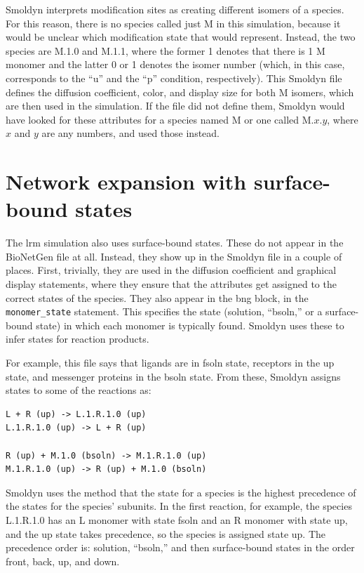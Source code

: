 \documentclass {scrbook}
\newcommand {\ttt} {\texttt}
\begin{document}
Smoldyn interprets modification sites as creating different isomers of a species. For this reason, there is no species called just M in this simulation, because it would be unclear which modification state that would represent. Instead, the two species are M.1.0 and M.1.1, where the former 1 denotes that there is 1 M monomer and the latter 0 or 1 denotes the isomer number (which, in this case, corresponds to the ``u'' and the ``p'' condition, respectively). This Smoldyn file defines the diffusion coefficient, color, and display size for both M isomers, which are then used in the simulation. If the file did not define them, Smoldyn would have looked for these attributes for a species named M or one called M.$x$.$y$, where $x$ and $y$ are any numbers, and used those instead.

\section{Network expansion with surface-bound states}

The lrm simulation also uses surface-bound states. These do not appear in the BioNetGen file at all. Instead, they show up in the Smoldyn file in a couple of places. First, trivially, they are used in the diffusion coefficient and graphical display statements, where they ensure that the attributes get assigned to the correct states of the species. They also appear in the bng block, in the \ttt{monomer\_state} statement. This specifies the state (solution, ``bsoln,'' or a surface-bound state) in which each monomer is typically found. Smoldyn uses these to infer states for reaction products.

For example, this file says that ligands are in fsoln state, receptors in the up state, and messenger proteins in the bsoln state. From these, Smoldyn assigns states to some of the reactions as:

\begin{lstlisting}[style=SSAC]
L + R (up) -> L.1.R.1.0 (up)
L.1.R.1.0 (up) -> L + R (up)

R (up) + M.1.0 (bsoln) -> M.1.R.1.0 (up)
M.1.R.1.0 (up) -> R (up) + M.1.0 (bsoln)
\end{lstlisting}

Smoldyn uses the method that the state for a species is the highest precedence of the states for the species' subunits. In the first reaction, for example, the species L.1.R.1.0 has an L monomer with state fsoln and an R monomer with state up, and the up state takes precedence, so the species is assigned state up. The precedence order is: solution, ``bsoln,'' and then surface-bound states in the order front, back, up, and down.
\end{document}
